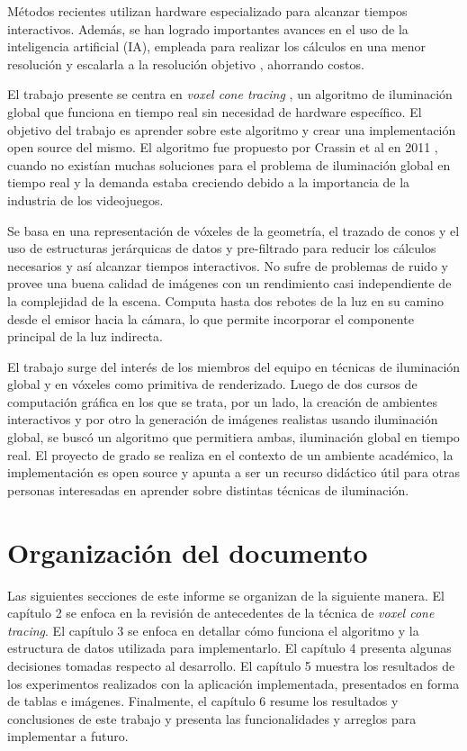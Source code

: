 Métodos recientes utilizan hardware especializado para alcanzar tiempos interactivos.
Además, se han logrado importantes avances en el uso de la inteligencia artificial (IA), empleada para realizar los cálculos en una menor resolución y escalarla a la resolución objetivo \cite{image-super-resolution-survey}, ahorrando costos.

El trabajo presente se centra en \textit{voxel cone tracing} \cite{voxel-cone-tracing}, un algoritmo de iluminación global que funciona en tiempo real sin necesidad de hardware específico.
El objetivo del trabajo es aprender sobre este algoritmo y crear una implementación open source del mismo.
El algoritmo fue propuesto por Crassin et al en 2011 \cite{voxel-cone-tracing}, cuando no existían muchas soluciones para el problema de iluminación global en tiempo real y la demanda estaba creciendo debido a la importancia de la industria de los videojuegos.

Se basa en una representación de vóxeles \cite[p.~578]{rtr} de la geometría, el trazado de conos \cite{ray-tracing-with-cones} y el uso de estructuras jerárquicas de datos y pre-filtrado para reducir los cálculos necesarios y así alcanzar tiempos interactivos.
No sufre de problemas de ruido y provee una buena calidad de imágenes con un rendimiento casi independiente de la complejidad de la escena.
Computa hasta dos rebotes de la luz en su camino desde el emisor hacia la cámara, lo que permite incorporar el componente principal de la luz indirecta.

El trabajo surge del interés de los miembros del equipo en técnicas de iluminación global y en vóxeles como primitiva de renderizado.
Luego de dos cursos de computación gráfica en los que se trata, por un lado, la creación de ambientes interactivos y por otro la generación de imágenes realistas usando iluminación global, se buscó un algoritmo que permitiera ambas, iluminación global en tiempo real.
El proyecto de grado se realiza en el contexto de un ambiente académico, la implementación es open source y apunta a ser un recurso didáctico útil para otras personas interesadas en aprender sobre distintas técnicas de iluminación.

\section{Organización del documento}

Las siguientes secciones de este informe se organizan de la siguiente manera.
El capítulo 2 se enfoca en la revisión de antecedentes de la técnica de \textit{voxel cone tracing}.
El capítulo 3 se enfoca en detallar cómo funciona el algoritmo y la estructura de datos utilizada para implementarlo.
El capítulo 4 presenta algunas decisiones tomadas respecto al desarrollo.
El capítulo 5 muestra los resultados de los experimentos realizados con la aplicación implementada, presentados en forma de tablas e imágenes.
Finalmente, el capítulo 6 resume los resultados y conclusiones de este trabajo y presenta las funcionalidades y arreglos para implementar a futuro.
